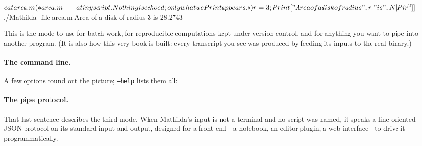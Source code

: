 \begin{shell}
$ cat area.m
(* area.m -- a tiny script. Nothing is echoed; only what we Print appears. *)
r = 3;
Print["Area of a disk of radius ", r, " is ", N[Pi r^2]]

$ ./Mathilda -file area.m
Area of a disk of radius 3 is 28.2743
\end{shell}

\noindent
This is the mode to use for batch work, for reproducible computations kept under
version control, and for anything you want to pipe into another program. (It is also
how this very book is built: every transcript you see was produced by feeding its
inputs to the real binary.)

\paragraph{The command line.} A few options round out the picture; \texttt{--help}
lists them all:


\paragraph{The pipe protocol.} That last sentence describes the third mode. When
Mathilda's input is not a terminal and no script was named, it speaks a line-oriented
JSON protocol on its standard input and output, designed for a front-end---a
notebook, an editor plugin, a web interface---to drive it programmatically.%

